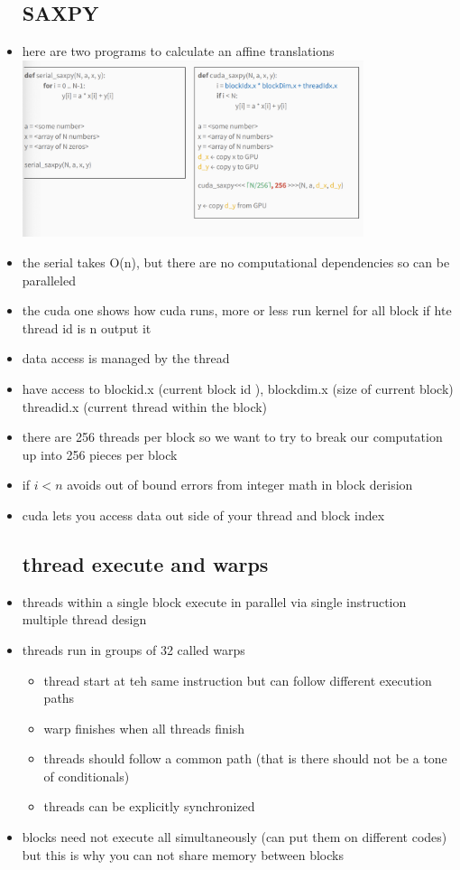 \documentclass{article}
\begin{document}
\begin{itemize}
\subsection*{SAXPY}
\item here are two programs to calculate an affine translations \\ \includegraphics*[width=10cm]{images/Screenshot 2023-05-11 at 11.43.40 PM.png}
\item the serial takes O(n), but there are no computational dependencies so can be paralleled
\item the cuda one shows how cuda runs, more or less run kernel for all block if hte thread id is n output it 
\item data access is managed by the thread
\item have access to blockid.x (current block id ), blockdim.x (size of current block) threadid.x (current thread within the block)
\item there are 256 threads per block so we want to try to break our computation up into 256 pieces per block 
\item if $i<n$ avoids out of bound errors from integer math in block derision 
\item cuda lets you access data out side of your thread and block index
\subsection*{thread execute and warps}
\item threads within a single block execute in parallel via single instruction multiple thread design 
\item threads run in groups of 32 called warps
\begin{itemize}
    \item thread start at teh same instruction but can follow different execution paths 
    \item warp finishes when all threads finish 
    \item threads should follow a common path (that is there should not be a tone of conditionals)
    \item threads can be explicitly synchronized
\end{itemize}
\item blocks need not execute all simultaneously (can put them on different codes) but this is why you can not share memory between blocks

\end{itemize}
\end{document}
